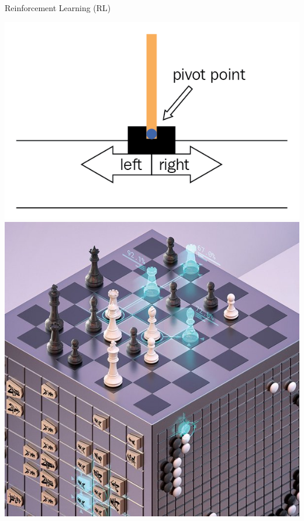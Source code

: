 \documentclass[aspectratio=1610]{beamer}
\begin{document}
\begin{frame}{Reinforcement Learning (RL)}
\begin{itemize}
\begin{minipage}[c]{0.20\textwidth}
			\includegraphics[width=\linewidth]{figures/cartpole.png}\\[1cm]
			\includegraphics[width=\linewidth]{figures/alphazero.png}
		\end{minipage}
		\begin{minipage}[c]{0.20\textwidth}

\end{minipage}
\end{itemize}
\end{frame}
\end{document}
